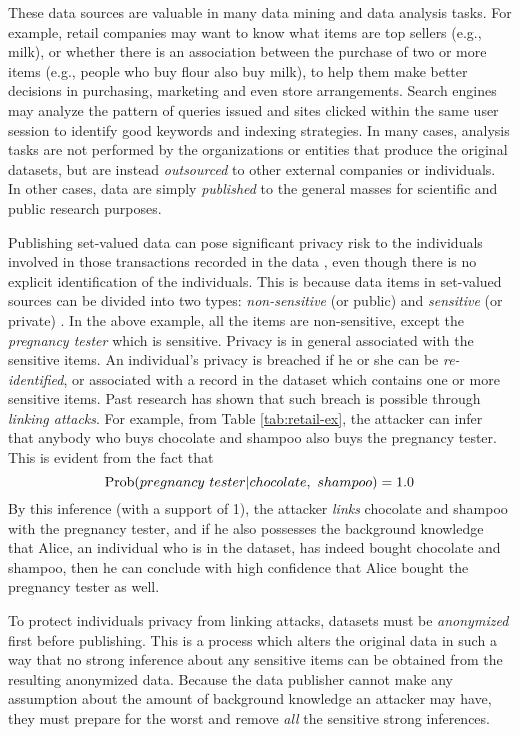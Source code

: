 These data sources are valuable in many data mining and data analysis tasks.
For example, retail companies may want to know what items are top sellers
(e.g., milk), or whether there is an association between the purchase of
two or more items (e.g., people who buy flour also buy milk),
to help them make better decisions in purchasing, marketing and even store
arrangements. Search engines may analyze the pattern of queries issued and
sites clicked within the same user session to identify good keywords and
indexing strategies. In many cases, analysis tasks are not performed by the
organizations or entities that produce the original datasets, but are instead
{\em outsourced} to other external companies or individuals. In other cases,
data are simply {\em published} to the general masses for
scientific and public research purposes.

Publishing set-valued data can pose significant privacy risk to
the individuals involved in
those transactions recorded in the data \cite{FungWCY10:Survey}, even though
there is no explicit identification of the individuals. This is
because data items in set-valued sources can be divided into two types:
{\em non-sensitive} (or public) and {\em sensitive} (or private)
\cite{Xu:2008:ATD}. In the above example, all the items
are non-sensitive, except the {\em pregnancy tester} which is sensitive.
Privacy is in general associated with the sensitive items.
An individual's privacy is breached if he or she can be {\em re-identified},
or associated with a record in the dataset
which contains one or more sensitive items.
Past research has shown that such breach is possible through {\em linking
attacks}\cite{FungWCY10:Survey}. For example, from Table \ref{tab:retail-ex},
the attacker can infer that anybody who buys chocolate and shampoo also
buys the pregnancy tester. This is evident from the fact that
\[{\rm Prob}(pregnancy~tester | chocolate,~ shampoo) = 1.0\]
By this inference (with a support of 1), the attacker {\em links}
chocolate and shampoo with the pregnancy tester,
and if he also possesses the background knowledge that Alice,
an individual who is in the dataset, has indeed bought chocolate and shampoo,
then he can conclude with high confidence that Alice bought the
pregnancy tester as well.

To protect individuals privacy from linking attacks, datasets must be
{\em anonymized} first before publishing. This is a process which
alters the original data in such a way that no strong inference about any
sensitive items can be obtained from the resulting anonymized data.
Because the data publisher cannot make any assumption about the amount of
background knowledge an attacker may have, they must prepare for the worst
and remove {\em all} the sensitive strong inferences.

